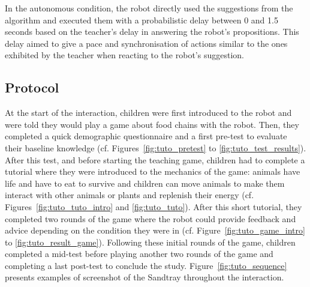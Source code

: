 In the autonomous condition, the robot directly used the suggestions from the algorithm and executed them with a probabilistic delay between 0 and 1.5 seconds based on the teacher's delay in answering the robot's propositions. This delay aimed to give a pace and synchronisation of actions similar to the ones exhibited by the teacher when reacting to the robot's suggestion.

\subsection{Protocol}

At the start of the interaction, children were first introduced to the robot and were told they would play a game about food chains with the robot. Then, they completed a quick demographic questionnaire and a first pre-test to evaluate their baseline knowledge (cf. Figures~\ref{fig:tuto_pretest} to \ref{fig:tuto_test_results}). After this test, and before starting the teaching game, children had to complete a tutorial where they were introduced to the mechanics of the game: animals have life and have to eat to survive and children can move animals to make them interact with other animals or plants and replenish their energy (cf. Figures~\ref{fig:tuto_tuto_intro} and \ref{fig:tuto_tuto}). After this short tutorial, they completed two rounds of the game where the robot could provide feedback and advice depending on the condition they were in (cf. Figure~\ref{fig:tuto_game_intro} to \ref{fig:tuto_result_game}). Following these initial rounds of the game, children completed a mid-test before playing another two rounds of the game and completing a last post-test to conclude the study. Figure~\ref{fig:tuto_sequence} presents examples of screenshot of the Sandtray throughout the interaction.


